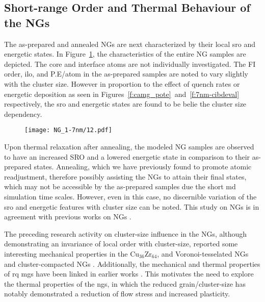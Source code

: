 \subsection{Short-range Order and Thermal Behaviour of the NGs}
The as-prepared and annealed NGs are next characterized by their local \gls{sro} and energetic states. In Figure~\ref{f:NG_str-PE}, the characteristics of the entire NG samples are depicted. The core and interface atoms are not individually investigated. The FI order, \gls{ilo}, and P.E/atom in the as-prepared samples are noted to vary slightly with the cluster size. However in proportion to the effect of quench rates or energetic deposition as seen in Figures~\ref{f:camg_pote}~and~\ref{f:7nm-cibdeval} respectively, the \gls{sro} and energetic states are found to be belie the cluster size dependency. \par

\begin{figure}[!h] \centering
	\texttt{[image: NG\_1-7nm/12.pdf]}
	\label{f:NG_str-PE}
\end{figure}

Upon thermal relaxation after annealing, the modeled NG samples are observed to have an increased SRO and a lowered energetic state in comparison to their as-prepared states. Annealing, which we have previously found to promote atomic readjustment, therefore possibly assisting the NGs to attain their final states, which may not be accessible by the as-prepared samples due the short \gls{md} simulation time scales. However, even in this case, no discernible variation of the \gls{sro} and energetic features with cluster size can be noted. This study on \cz NGs is in agreement with previous works on \czsix NGs \cite{Cheng2019a}. \par

The preceding research activity on cluster-size influence in the NGs, although demonstrating an invariance of local order with cluster-size, reported some interesting mechanical properties in the Cu$_{36}$Zr$_{64}$, \cz and \czsix Voronoi-tesselated NGs \cite{Adibi2013,Adibi2014} and cluster-compacted NGs \cite{Cheng2019a}. Additionally, the mechanical and thermal properties of \gls{rq} \gls{mg}s have been linked in earlier works \cite{Su2016,Battezzati2009,Bian2021}. This motivates the need to explore the thermal properties of the \gls{ng}s, in which the reduced grain/cluster-size has notably demonstrated a reduction of flow stress and increased plasticity. \par

